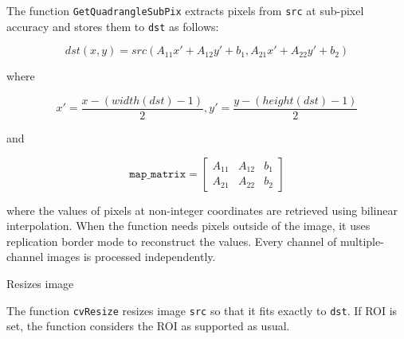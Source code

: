 \begin{description}
\end{description}

The function \texttt{GetQuadrangleSubPix} extracts pixels from \texttt{src} at sub-pixel accuracy and stores them to \texttt{dst} as follows:

\[
dst(x, y)= src( A_{11} x' + A_{12} y' + b_1, A_{21} x' + A_{22} y' + b_2)
\]

where

\[
x'=\frac{x-(width(dst)-1)}{2}, 
y'=\frac{y-(height(dst)-1)}{2}
\]

and

\[
\texttt{map\_matrix} = \begin{bmatrix}
A_{11} & A_{12} & b_1\\
A_{21} & A_{22} & b_2
\end{bmatrix}
\]

where the values of pixels at non-integer coordinates are retrieved using bilinear interpolation. When the function needs pixels outside of the image, it uses replication border mode to reconstruct the values. Every channel of multiple-channel images is processed independently.


\label{Resize}
Resizes image


\begin{description}
\end{description}

The function \texttt{cvResize} resizes image \texttt{src} so that it fits exactly to \texttt{dst}. If ROI is set, the function considers the ROI as supported as usual.

